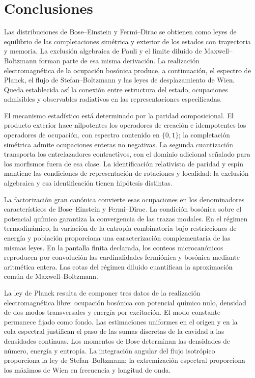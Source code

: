 \begingroup\fontsize{10}{11.8}\selectfont\setlength{\parskip}{2pt}
\section{Conclusiones}
\label{v:conclusiones}
Las distribuciones de Bose--Einstein y Fermi--Dirac se obtienen como leyes
de equilibrio de las completaciones simétrica y exterior de los estados
con trayectoria y memoria. La exclusión algebraica de Pauli y el límite
diluido de Maxwell--Boltzmann forman parte de esa misma derivación.
La realización electromagnética de la ocupación bosónica produce,
a continuación, el espectro de Planck, el flujo de Stefan--Boltzmann y
las leyes de desplazamiento de Wien. Queda establecida así la conexión
entre estructura del estado, ocupaciones admisibles y observables
radiativos en las representaciones especificadas.

El mecanismo estadístico está determinado por la paridad composicional.
El producto exterior hace nilpotentes los operadores de creación e
idempotentes los operadores de ocupación, con espectro contenido en
\(\{0,1\}\); la completación simétrica admite ocupaciones enteras no
negativas. La segunda cuantización transporta los entrelazadores
contractivos, con el dominio adicional señalado para los morfismos
fuera de esa clase. La identificación relativista de paridad y espín
mantiene las condiciones de representación de rotaciones y localidad:
la exclusión algebraica y esa identificación tienen hipótesis distintas.

La factorización gran canónica convierte esas ocupaciones en los
denominadores característicos de Bose--Einstein y Fermi--Dirac.
La condición bosónica sobre el potencial químico garantiza la
convergencia de las trazas modales. En el régimen termodinámico, la
variación de la entropía combinatoria bajo restricciones de energía y población
proporciona una caracterización complementaria de las mismas leyes.
En la pantalla finita declarada,
los conteos microcanónicos reproducen por convolución las cardinalidades
fermiónica y bosónica mediante aritmética entera. Las cotas del régimen
diluido cuantifican la aproximación común de Maxwell--Boltzmann.

La ley de Planck resulta de componer tres datos de la realización
electromagnética libre: ocupación bosónica con potencial químico nulo,
densidad de dos modos transversales y energía por excitación.
El modo constante permanece fijado como fondo. Las estimaciones
uniformes en el origen y en la cola espectral justifican el paso de las
sumas discretas de la cavidad a las densidades continuas. Los momentos
de Bose determinan las densidades de número, energía y entropía.
La integración angular del flujo isotrópico proporciona la ley de
Stefan--Boltzmann; la extremización espectral proporciona los máximos
de Wien en frecuencia y longitud de onda.

